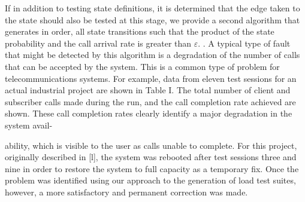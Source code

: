\documentclass[journal, twoside]{IEEEtran}
\begin{document}
If in addition to testing state definitions, it is determined
that the edge taken to the state should also be tested at this
stage, we provide a second algorithm that generates in order,
all state transitions such that the product of the state probability and the call arrival rate is greater than $\varepsilon$. . A typical type of
fault that might be detected by this algorithm is a degradation
of the number of calls that can be accepted by the system. This
is a common type of problem for telecommunications systems.
For example, data from eleven test sessions for an actual industrial project are shown in Table I. The total number of client and subscriber calls made during the run, and the call
completion rate achieved are shown. These call completion
rates clearly identify a major degradation in the system avail- \vspace{5cm} 

ability, which is visible to the user as calls unable to complete.
For this project, originally described in [l], the system was
rebooted after test sessions three and nine in order to restore
the system to full capacity as a temporary fix. Once the problem was identified using our approach to the generation of
load test suites, however, a more satisfactory and permanent
correction was made. 
\end{document}
